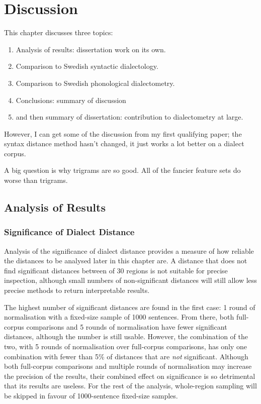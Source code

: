 \chapter{Discussion}

This chapter discusses three topics:

\begin{enumerate}
\item Analysis of results: dissertation work on its own.
\item Comparison to Swedish syntactic dialectology.
\item Comparison to Swedish phonological dialectometry.
\item Conclusions: summary of discussion
\item and then summary of dissertation: contribution to dialectometry at large.
\end{enumerate}

However, I can get some of the discussion from my first qualifying
paper; the syntax distance method hasn't changed, it just works a lot
better on a dialect corpus.

A big question is why trigrams are so good. All of the fancier feature
sets do worse than trigrams.


\section{Analysis of Results}


\subsection{Significance of Dialect Distance}

Analysis of the significance of dialect distance provides a measure of
how reliable the distances to be analysed later in this chapter are. A
distance that does not find significant distances between of 30
regions is not suitable for precise inspection, although small numbers
of non-significant distances will still allow less precise methods to
return interpretable results.

The highest number of significant distances are found in the first
case: 1 round of normalisation with a fixed-size sample of 1000
sentences. From there, both full-corpus comparisons and 5 rounds of
normalisation have fewer significant distances, although the number is
still usable. However, the combination of the two, with 5 rounds of
normalisation over full-corpus comparisons, has only one combination
with fewer than 5\% of distances that are {\it not}
significant. Although both full-corpus comparisons and multiple
rounds of normalisation may increase the precision of the results,
their combined effect on significance is so detrimental that its
results are useless. For the rest of the analysis,
whole-region sampling will be skipped in favour of 1000-sentence
fixed-size samples.

